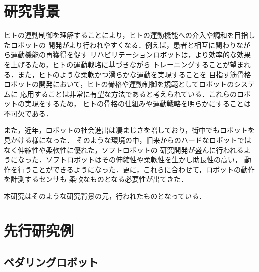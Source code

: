 \section{研究背景}

ヒトの運動制御を理解することにより，ヒトの運動機能への介入や調和を目指したロボットの
開発がより行われやすくなる．例えば，患者と相互に関わりながら運動機能の再獲得を促す
リハビリテーションロボットは，より効率的な効果を上げるため，ヒトの運動戦略に基づきながら
トレーニングすることが望まれる．また，ヒトのような柔軟かつ滑らかな運動を実現することを
目指す筋骨格ロボットの開発において，ヒトの骨格や運動制御を規範としてロボットのシステムに
応用することは非常に有望な方法であると考えられている．これらのロボットの実現をするため，
ヒトの骨格の仕組みや運動戦略を明らかにすることは不可欠である．

また，近年，ロボットの社会進出は凄まじさを増しており，街中でもロボットを見かける様になった．
そのような環境の中，旧来からのハードなロボットではなく伸縮性や柔軟性に優れた，ソフトロボットの
研究開発が盛んに行われるようになった．ソフトロボットはその伸縮性や柔軟性を生かし助長性の高い，
動作を行うことができるようになった．更に，これらに合わせて，ロボットの動作を計測するセンサも
柔軟なものとなる必要性が出てきた．

本研究はそのような研究背景の元，行われたものとなっている．

\section{先行研究例}
\subsection{ペダリングロボット}

